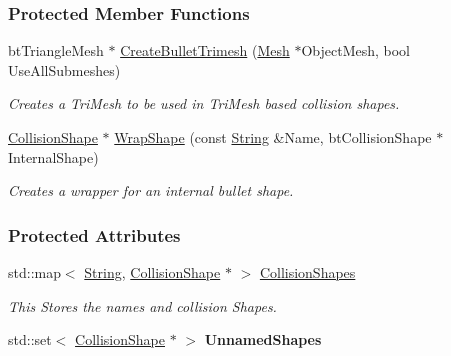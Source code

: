 \subsubsection*{Protected Member Functions}
\begin{DoxyCompactItemize}
\item 
\hypertarget{classphys_1_1CollisionShapeManager_a2dc4063a427740881255a030315b06c2}{
btTriangleMesh $\ast$ \hyperlink{classphys_1_1CollisionShapeManager_a2dc4063a427740881255a030315b06c2}{CreateBulletTrimesh} (\hyperlink{classphys_1_1Mesh}{Mesh} $\ast$ObjectMesh, bool UseAllSubmeshes)}
\label{classphys_1_1CollisionShapeManager_a2dc4063a427740881255a030315b06c2}

\begin{DoxyCompactList}\small\item\em Creates a TriMesh to be used in TriMesh based collision shapes. \item\end{DoxyCompactList}\item 
\hypertarget{classphys_1_1CollisionShapeManager_a989d6eebe7e6bf2be6a33cfdb635b7c7}{
\hyperlink{classphys_1_1CollisionShape}{CollisionShape} $\ast$ \hyperlink{classphys_1_1CollisionShapeManager_a989d6eebe7e6bf2be6a33cfdb635b7c7}{WrapShape} (const \hyperlink{namespacephys_aa03900411993de7fbfec4789bc1d392e}{String} \&Name, btCollisionShape $\ast$InternalShape)}
\label{classphys_1_1CollisionShapeManager_a989d6eebe7e6bf2be6a33cfdb635b7c7}

\begin{DoxyCompactList}\small\item\em Creates a wrapper for an internal bullet shape. \item\end{DoxyCompactList}\end{DoxyCompactItemize}
\subsubsection*{Protected Attributes}
\begin{DoxyCompactItemize}
\item 
\hypertarget{classphys_1_1CollisionShapeManager_a4f3ac5e89c83dc344edc98db7f24db00}{
std::map$<$ \hyperlink{namespacephys_aa03900411993de7fbfec4789bc1d392e}{String}, \hyperlink{classphys_1_1CollisionShape}{CollisionShape} $\ast$ $>$ \hyperlink{classphys_1_1CollisionShapeManager_a4f3ac5e89c83dc344edc98db7f24db00}{CollisionShapes}}
\label{classphys_1_1CollisionShapeManager_a4f3ac5e89c83dc344edc98db7f24db00}

\begin{DoxyCompactList}\small\item\em This Stores the names and collision Shapes. \item\end{DoxyCompactList}\item 
\hypertarget{classphys_1_1CollisionShapeManager_a28e56317f5e54a83443606f4ef1500d6}{
std::set$<$ \hyperlink{classphys_1_1CollisionShape}{CollisionShape} $\ast$ $>$ {\bfseries UnnamedShapes}}
\label{classphys_1_1CollisionShapeManager_a28e56317f5e54a83443606f4ef1500d6}

\end{DoxyCompactItemize}


